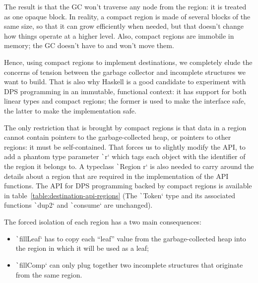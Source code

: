 \documentclass[english]{jflart}
\begin{document}
The result is that the GC won't traverse any node from the region: it is treated as one opaque block. In reality, a compact region is made of several blocks of the same size, so that it can grow efficiently when needed, but that doesn't change how things operate at a higher level. Also, compact regions are immobile in memory; the GC doesn't have to and won't move them.

Hence, using compact regions to implement destinations, we completely elude the concerns of tension between the garbage collector and incomplete structures we want to build. That is also why Haskell is a good candidate to experiment with DPS programming in an immutable, functional context: it has support for both linear types and compact regions; the former is used to make the interface safe, the latter to make the implementation safe.

The only restriction that is brought by compact regions is that data in a region cannot contain pointers to the garbage-collected heap, or pointers to other regions: it must be self-contained. That forces us to slightly modify the API, to add a phantom type parameter \texttt`r` which tags each object with the identifier of the region it belongs to. A typeclass \texttt`Region r` is also needed to carry around the details about a region that are required in the implementation of the API functions. The API for DPS programming backed by compact regions is available in table~\ref{table:destination-api-regions} (The \texttt`Token` type and its associated functions \texttt`dup2` and \texttt`consume` are unchanged).

The forced isolation of each region has a two main consequences:
\begin{itemize}
  \item \texttt`fillLeaf` has to copy each ``leaf'' value from the garbage-collected heap into the region in which it will be used as a leaf;
  \item \texttt`fillComp` can only plug together two incomplete structures that originate from the same region.
\end{itemize}
\end{document}
